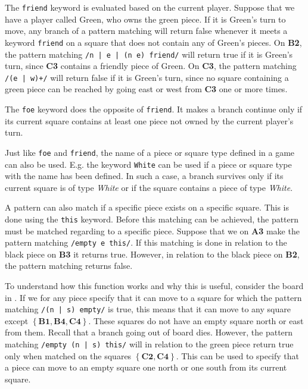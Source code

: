 The \texttt{friend} keyword is evaluated based on the current player. Suppose
that we have a player called Green, who owns the green piece. If it is Green's
turn to move, any branch of a pattern matching will return false whenever it
meets a keyword \texttt{friend} on a square that does not contain any of Green's
pieces. On \textbf{B2}, the pattern matching \texttt{/n | e | (n e) friend/}
will return true if it is Green's turn, since \textbf{C3} contains a friendly
piece of Green. On \textbf{C3}, the pattern matching \texttt{/(e | w)+/} will
return false if it is Green's turn, since no square containing a green piece can
be reached by going east or west from \textbf{C3} one or more times.

The \texttt{foe} keyword does the opposite of \texttt{friend}. It makes a branch
continue only if its current square contains at least one piece not owned by the
current player's turn.

Just like \texttt{foe} and \texttt{friend}, the name of a piece or square type
defined in a \productname{} game can also be used. E.g. the keyword
\texttt{White} can be used if a piece or square type with the name has been
defined. In such a case, a branch survives only if its current square is of type
\textit{White} or if the square contains a piece of type \textit{White}.

A pattern can also match if a specific piece exists on a specific square. This
is done using the \texttt{this} keyword. Before this matching can be achieved,
the pattern must be matched regarding to a specific piece. Suppose that we on
\textbf{A3} make the pattern matching \texttt{/empty e this/}. If this matching
is done in relation to the black piece on \textbf{B3} it returns true. However,
in relation to the black piece on \textbf{B2}, the pattern matching returns
false. 

To understand how this function works and why this is useful, consider
the board in . If we for any piece specify that it can
move to a square for which the pattern matching \texttt{/(n | s) empty/} is
true, this means that it can move to any square except $\mathbf{\left\{B1, B4,
C4\right\}}$. These squares do not have an empty square north or east from them.
Recall that a branch going out of board dies.  However, the pattern matching
\texttt{/empty (n | s) this/} will in relation to the green piece return true
only when matched on the squares $\mathbf{\left\{ C2, C4\right\}}$.  This can be
used to specify that a piece can move to an empty square one north or one south
from its current square. 

